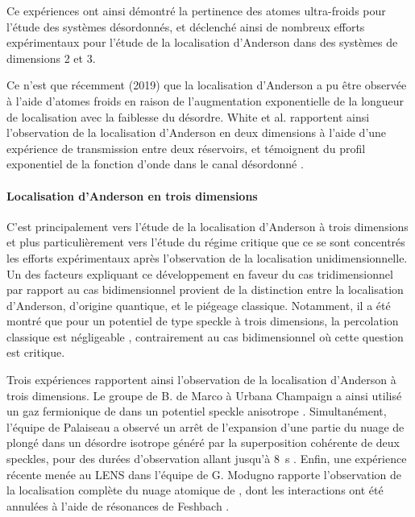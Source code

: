 Ce expériences ont ainsi démontré la pertinence des atomes ultra-froids pour l'étude des systèmes désordonnés, et déclenché ainsi de nombreux efforts expérimentaux pour l'étude de la localisation d'Anderson dans des systèmes de dimensions 2 et 3. 

Ce n'est que récemment (2019) que la localisation d'Anderson a pu être observée à l'aide d'atomes froids en raison de l'augmentation exponentielle de la longueur de localisation avec la faiblesse du désordre. White et al. rapportent ainsi l'observation de la localisation d'Anderson en deux dimensions à l'aide d'une expérience de transmission entre deux réservoirs, et témoignent du profil exponentiel de la fonction d'onde dans le canal désordonné \citep{white2019observation}. 



\paragraph*{Localisation d'Anderson en trois dimensions}

C'est principalement vers l'étude de la localisation d'Anderson à trois dimensions et plus particulièrement vers l'étude du régime critique que ce se sont concentrés les efforts expérimentaux après l'observation de la localisation unidimensionnelle. Un des facteurs expliquant ce développement en faveur du cas tridimensionnel par rapport au cas bidimensionnel provient de la distinction entre la localisation d'Anderson, d'origine quantique, et le piégeage classique. Notamment, il a été montré que pour un potentiel de type speckle à trois dimensions, la percolation classique est négligeable \citep{pilati2010dilute}, contrairement au cas bidimensionnel où cette question est critique.

Trois expériences rapportent ainsi l'observation de la localisation d'Anderson à trois dimensions. Le groupe de B. de Marco à Urbana Champaign a ainsi utilisé un gaz fermionique de  dans un potentiel speckle anisotrope \citep{kondov2011three}. Simultanément, l'équipe de Palaiseau a observé un arrêt de l'expansion d'une partie du nuage de  plongé dans un désordre isotrope généré par la superposition cohérente de deux speckles, pour des durées d'observation allant jusqu'à \SI{8}{\second} \citep{jendrzejewski2012three}. Enfin, une expérience récente menée au LENS dans l'équipe de G. Modugno rapporte l'observation de la localisation complète du nuage atomique de , dont les interactions ont été annulées à l'aide de résonances de Feshbach \citep{semeghini2015measurement}.

